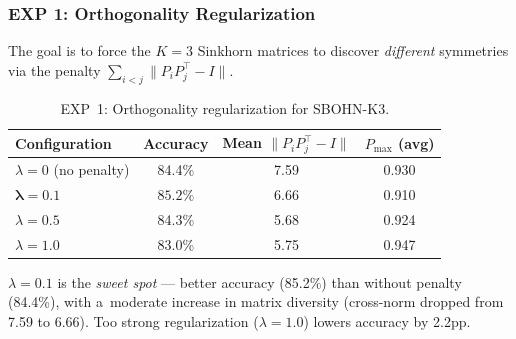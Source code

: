\subsubsection*{EXP 1: Orthogonality Regularization}

The goal is to force the $K=3$ Sinkhorn matrices to discover \emph{different} symmetries via the penalty $\sum_{i<j} \|P_i P_j^\top - I\|$.

\begin{table}[h]
\centering
\caption{EXP~1: Orthogonality regularization for SBOHN-K3.}
\begin{tabular}{lccc}
\hline
\textbf{Configuration} & \textbf{Accuracy} & \textbf{Mean $\|P_iP_j^\top - I\|$} & \textbf{$P_{\max}$ (avg)} \\
\hline
$\lambda=0$ (no penalty) & 84.4\% & 7.59 & 0.930 \\
$\boldsymbol{\lambda=0.1}$ & $\boldsymbol{85.2\%}$ & $\boldsymbol{6.66}$ & 0.910 \\
$\lambda=0.5$ & 84.3\% & 5.68 & 0.924 \\
$\lambda=1.0$ & 83.0\% & 5.75 & 0.947 \\
\hline
\end{tabular}
\end{table}

$\lambda=0.1$ is the \emph{sweet spot} --- better accuracy (85.2\%) than without penalty (84.4\%), with a~moderate increase in matrix diversity (cross-norm dropped from 7.59 to 6.66). Too strong regularization ($\lambda=1.0$) lowers accuracy by 2.2pp.
